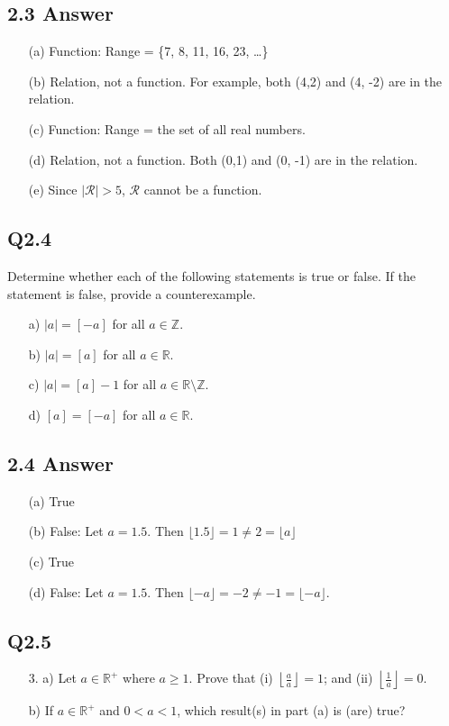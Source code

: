 \documentclass{article}
\begin{document}
\subsection*{2.3 Answer}
\begin{enumerate}
    \item[(a)] Function: Range = \{7, 8, 11, 16, 23, \ldots\}
    \item[(b)] Relation, not a function. For example, both (4,2) and (4, -2) are in the relation.
    \item[(c)] Function: Range = the set of all real numbers.
    \item[(d)] Relation, not a function. Both (0,1) and (0, -1) are in the relation.
    \item[(e)] Since \( |\mathcal{R}| > 5 \), \( \mathcal{R} \) cannot be a function.
\end{enumerate}
\newpage
\subsection*{Q2.4}
Determine whether each of the following statements is true or false. If the statement is false, provide a counterexample.
\begin{enumerate}
    \item[a)] \( |a| = [-a] \) for all \( a \in \mathbb{Z} \).
    \item[b)] \( |a| = [a] \) for all \( a \in \mathbb{R} \).
    \item[c)] \( |a| = [a] - 1 \) for all \( a \in \mathbb{R} \setminus \mathbb{Z} \).
    \item[d)] \( [a] = [-a] \) for all \( a \in \mathbb{R} \).
\end{enumerate}
\newpage
\subsection*{2.4 Answer}
\begin{enumerate}
    \item[(a)] True
    \item[(b)] False: Let \( a = 1.5 \). Then \( \lfloor 1.5 \rfloor = 1 \neq 2 = \lfloor a \rfloor \)
    \item[(c)] True
    \item[(d)] False: Let \( a = 1.5 \). Then \( \lfloor -a \rfloor = -2 \neq -1 = \lfloor -a \rfloor \).
\end{enumerate}
\newpage
\subsection*{Q2.5}
\begin{enumerate}
    \item[3. a)] Let \( a \in \mathbb{R}^+ \) where \( a \geq 1 \). Prove that (i) \( \left\lfloor \frac{a}{a} \right\rfloor = 1 \); and (ii) \( \left\lfloor \frac{1}{a} \right\rfloor = 0 \).
    \item[b)] If \( a \in \mathbb{R}^+ \) and \( 0 < a < 1 \), which result(s) in part (a) is (are) true?
\end{enumerate}
\newpage
\end{document}

